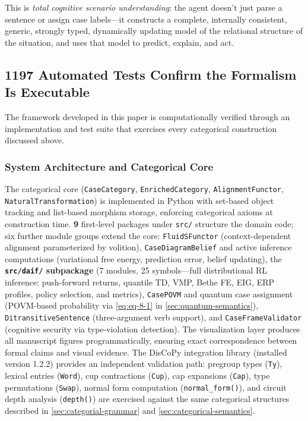 \documentclass[
]{article}
\begin{document}
This is \emph{total cognitive scenario understanding}: the agent doesn't
just parse a sentence or assign case labels---it constructs a complete,
internally consistent, generic, strongly typed, dynamically updating
model of the relational structure of the situation, and uses that model
to predict, explain, and act.

\subsection{1197 Automated Tests Confirm the Formalism Is
Executable}\label{automated-tests-confirm-the-formalism-is-executable}

The framework developed in this paper is computationally verified
through an implementation and test suite that exercises every
categorical construction discussed above.

\subsubsection{System Architecture and Categorical
Core}\label{system-architecture-and-categorical-core}

The categorical core (\texttt{CaseCategory}, \texttt{EnrichedCategory},
\texttt{AlignmentFunctor}, \texttt{NaturalTransformation}) is
implemented in Python with set-based object tracking and list-based
morphism storage, enforcing categorical axioms at construction time.
\textbf{9} first-level packages under \texttt{src/} structure the domain
code; six further module groups extend the core: \texttt{FluidSFunctor}
(context-dependent alignment parameterized by volition),
\texttt{CaseDiagramBelief} and active inference computations
(variational free energy, prediction error, belief updating), the
\textbf{\texttt{src/daif/} subpackage} (7 modules, 25 symbols---full
distributional RL inference: push-forward returns, quantile TD, VMP,
Bethe FE, EIG, ERP profiles, policy selection, and metrics),
\texttt{CasePOVM} and quantum case assignment (POVM-based probability
via \autoref{eq:eq-8-1} in \autoref{sec:quantum-semantics}),
\texttt{DitransitiveSentence} (three-argument verb support), and
\texttt{CaseFrameValidator} (cognitive security via type-violation
detection). The visualization layer produces all manuscript figures
programmatically, ensuring exact correspondence between formal claims
and visual evidence. The DisCoPy integration library (installed version
1.2.2) provides an independent validation path: pregroup types
(\texttt{Ty}), lexical entries (\texttt{Word}), cup contractions
(\texttt{Cup}), cap expansions (\texttt{Cap}), type permutations
(\texttt{Swap}), normal form computation (\texttt{normal\_form()}), and
circuit depth analysis (\texttt{depth()}) are exercised against the same
categorical structures described in \autoref{sec:categorial-grammar} and
\autoref{sec:categorical-semantics}.
\end{document}
